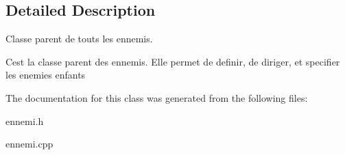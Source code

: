 \subsection{Detailed Description}
Classe parent de touts les ennemis. 

C\textquotesingle{}est la classe parent des ennemis. Elle permet de definir, de diriger, et specifier les enemies enfants 

The documentation for this class was generated from the following files\+:\begin{DoxyCompactItemize}
\item 
ennemi.\+h\item 
ennemi.\+cpp\end{DoxyCompactItemize}
